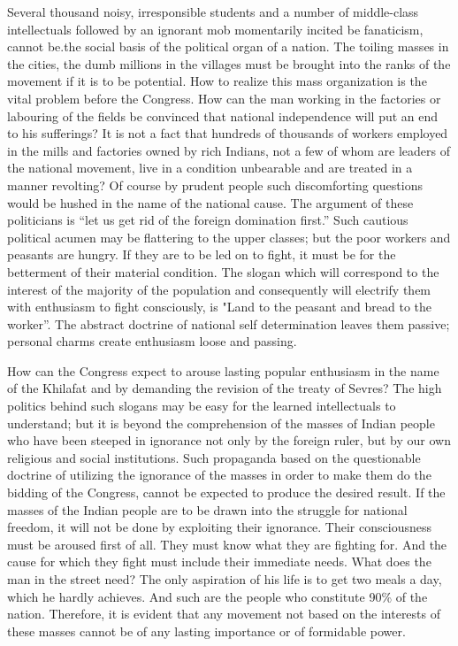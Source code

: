 Several thousand noisy, irresponsible students and a number of middle-class intellectuals followed by an ignorant mob momentarily incited be fanaticism, cannot be.the social basis of the political organ of a nation. The toiling masses in the cities, the dumb millions in the villages must be brought into the ranks of the movement if it is to be potential. How to realize this mass organization is the vital problem before the Congress. How can the man working in the factories or labouring of the fields be convinced that national independence will put an end to his sufferings? It is not a fact that hundreds of thousands of workers employed in the mills and factories owned by rich Indians, not a few of whom are leaders of the national movement, live in a condition unbearable and are treated in a manner revolting? Of course by prudent people such discomforting questions would be hushed in the name of the national cause. The argument of these politicians is “let us get rid of the foreign domination first.” Such cautious political acumen may be flattering to the upper classes; but the poor workers and peasants are hungry. If they are to be led on to fight, it must be for the betterment of their material condition. The slogan which will correspond to the interest of the majority of the population and consequently will electrify them with enthusiasm to fight consciously, is "Land to the peasant and bread to the worker”. The abstract doctrine of national self determination leaves them passive; personal charms create enthusiasm loose and passing. 

How can the Congress expect to arouse lasting popular enthusiasm in the name of the Khilafat and by demanding the revision of the treaty of Sevres? The high politics behind such slogans may be easy for the learned intellectuals to understand; but it is beyond the comprehension of the masses of Indian people who have been steeped in ignorance not only by the foreign ruler, but by our own religious and social institutions. Such propaganda based on the questionable doctrine of utilizing the ignorance of the masses in order to make them do the bidding of the Congress, cannot be expected to produce the desired result. If the masses of the Indian people are to be drawn into the struggle for 
national freedom, it will not be done by exploiting their ignorance. Their consciousness must be aroused first of all. They must know what they are fighting for. And the cause for which they fight must include their immediate needs. What does the man in the street need? The only aspiration of his life is to get two meals a day, which he hardly achieves. And such are the people who constitute 90\% of the nation. Therefore, it is evident that any movement not based on the interests of these masses cannot be of any lasting importance or of formidable power. 

